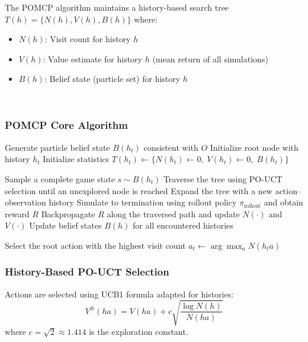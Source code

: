 \documentclass[journal,transmag]{IEEEtran}
\begin{document}
The POMCP algorithm maintains a history-based search tree $T(h) = \{N(h), V(h), B(h)\}$ where:
\begin{itemize}
    \item $N(h)$: Visit count for history $h$
    \item $V(h)$: Value estimate for history $h$ (mean return of all simulations)
    \item $B(h)$: Belief state (particle set) for history $h$
\end{itemize} \\

\subsubsection{POMCP Core Algorithm}

\begin{algorithm}[htp]
\caption{POMCP Decision Making from Player 1 Perspective}\label{Alg-POMCP-P1}
\begin{algorithmic}[1]

  \State Generate particle belief state $B(h_t)$ consistent with $O$
  \State Initialize root node with history $h_t$
  \State Initialize statistics $T(h_t) \gets \{N(h_t)\gets 0,\; V(h_t)\gets 0,\; B(h_t)\}$

    \State Sample a complete game state $s \sim B(h_t)$
    \State Traverse the tree using PO-UCT selection until an unexplored node is reached
    \State Expand the tree with a new action--observation history
    \State Simulate to termination using rollout policy $\pi_{\text{rollout}}$ and obtain reward $R$
    \State Backpropagate $R$ along the traversed path and update $N(\cdot)$ and $V(\cdot)$
    \State Update belief states $B(h)$ for all encountered histories
  \EndFor

  \State Select the root action with the highest visit count
  \State \Return $a_t \gets \arg\max_a N(h_t a)$
\end{algorithmic}
\end{algorithm}




\subsubsection{History-Based PO-UCT Selection}
Actions are selected using UCB1 formula adapted for histories:
\[
V^{\oplus}(ha) = V(ha) + c\sqrt{\frac{\log N(h)}{N(ha)}}
\]
where $c = \sqrt{2} \approx 1.414$ is the exploration constant.
\end{document}
